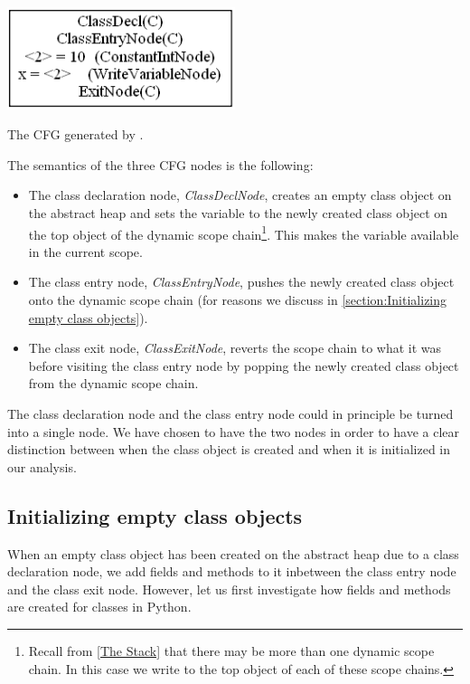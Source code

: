 \begin{listing}[H]
	\begin{center}
		\includegraphics[width=0.5\textwidth]{images/class-decl-cfg.png}
	\end{center}
	\vspace{-10pt}
	\caption{The CFG generated by .}
\end{listing}

The semantics of the three CFG nodes is the following:

\begin{itemize}
	\item The class declaration node, \textit{ClassDeclNode}, creates an empty class object on the abstract heap and sets the variable  to the newly created class object on the top object of the dynamic scope chain\footnote{Recall from \autoref{The Stack} that there may be more than one dynamic scope chain. In this case we write  to the top object of each of these scope chains.}. This makes the variable  available in the current scope.
	\item The class entry node, \textit{ClassEntryNode}, pushes the newly created class object onto the dynamic scope chain (for reasons we discuss in \autoref{section:Initializing empty class objects}).
	\item The class exit node, \textit{ClassExitNode}, reverts the scope chain to what it was before visiting the class entry node by popping the newly created class object from the dynamic scope chain.
\end{itemize}

The class declaration node and the class entry node could in principle be turned into a single node. We have chosen to have the two nodes in order to have a clear distinction between when the class object is created and when it is initialized in our analysis.


\subsection{Initializing empty class objects}
\label{section:Initializing empty class objects}
When an empty class object has been created on the abstract heap due to a class declaration node, we add fields and methods to it inbetween the class entry node and the class exit node. However, let us first investigate how fields and methods are created for classes in Python.

